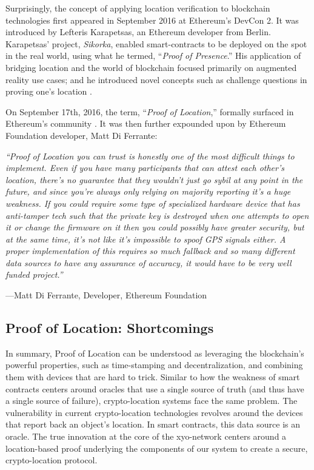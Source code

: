 \documentclass{article}
\begin{document}
Surprisingly, the concept of applying location verification to blockchain technologies first appeared in September 2016 at Ethereum's DevCon 2. It was introduced by Lefteris Karapetsas, an Ethereum developer from Berlin. Karapetsas' project, \textit{Sikorka}, enabled \glspl{smart-contract} to be deployed on the spot in the real world, using what he termed, ``\textit{Proof of Presence}.'' His application of bridging location and the world of blockchain focused primarily on augmented reality use cases; and he introduced novel concepts such as challenge questions in proving one's location \cite{karapetsas-sikorka}.

On September 17th, 2016, the term, ``\textit{Proof of Location},'' formally surfaced in Ethereum's community \cite{diferrante-proofoflocation}. It was then further expounded upon by Ethereum Foundation developer, Matt Di Ferrante:

\begin{displayquote}\textit{``Proof of Location you can trust is honestly one of the most difficult things to implement. Even if you have many participants that can attest each other's location, there's no guarantee that they wouldn't just go sybil at any point in the future, and since you're always only relying on majority reporting it's a huge weakness.
If you could require some type of specialized hardware device that has anti-tamper tech such that the private key is destroyed when one attempts to open it or change the firmware on it then you could possibly have greater security, but at the same time, it's not like it's impossible to spoof GPS signals either.
A proper implementation of this requires so much fallback and so many different data sources to have any assurance of accuracy, it would have to be very well funded project.''} \cite{diferrante-proofoflocation}

\vspace{2mm}
---Matt Di Ferrante, Developer, Ethereum Foundation
\end{displayquote}


\subsection {Proof of Location: Shortcomings}

In summary, Proof of Location can be understood as leveraging the blockchain's powerful properties, such as time-stamping and decentralization, and combining them with devices that are hard to trick. Similar to how the weakness of smart contracts centers around oracles that use a single source of truth (and thus have a single source of failure), crypto-location systems face the same problem. The vulnerability in current crypto-location technologies revolves around the devices that report back an object's location. In smart contracts, this data source is an oracle. The true innovation at the core of the \Gls{xyo-network} centers around a location-based proof underlying the components of our system to create a secure, crypto-location protocol.
\end{document}
